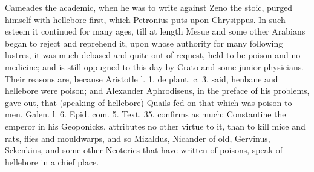 {Cameades the academic, when he was to write against Zeno the stoic,
purged himself with hellebore first, which Petronius puts upon
Chrysippus. In such esteem it continued for many ages, till at length
Mesue and some other Arabians began to reject and reprehend it, upon
whose authority for many following lustres, it was much debased and
quite out of request, held to be poison and no medicine; and is still
oppugned to this day by  Crato and some junior physicians. Their
reasons are, because Aristotle l. 1. de plant. c. 3. said, henbane and
hellebore were poison; and Alexander Aphrodiseus, in the preface of his
problems, gave out, that (speaking of hellebore) Quails fed on
that which was poison to men. Galen. l. 6. Epid. com. 5. Text. 35.
confirms as much: Constantine the emperor in his Geoponicks,
attributes no other virtue to it, than to kill mice and rats, flies and
mouldwarps, and so Mizaldus, Nicander of old, Gervinus, Sckenkius, and
some other Neoterics that have written of poisons, speak of hellebore
in a chief place.

}

